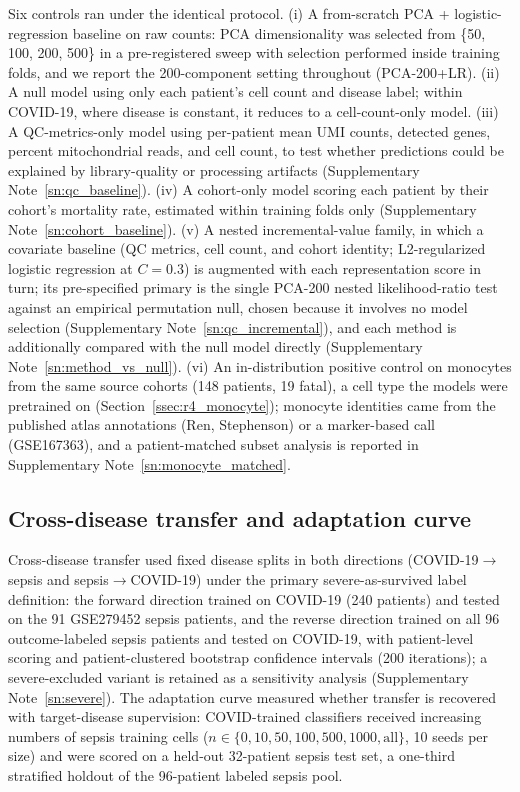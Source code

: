 \documentclass[11pt,a4paper]{article}
\begin{document}
Six controls ran under the identical protocol. (i) A from-scratch
PCA + logistic-regression baseline on raw counts: PCA dimensionality was
selected from \{50, 100, 200, 500\} in a pre-registered sweep with
selection performed inside training folds, and we report the 200-component
setting throughout (PCA-200+LR). (ii) A null model using only each patient's
cell count and disease label; within COVID-19, where disease is constant, it
reduces to a cell-count-only model. (iii) A QC-metrics-only model using
per-patient mean UMI counts, detected genes, percent mitochondrial reads, and
cell count, to test whether predictions could be explained by library-quality
or processing artifacts (Supplementary Note~\ref{sn:qc_baseline}).
(iv) A cohort-only model scoring each patient by their cohort's mortality
rate, estimated within training folds only
(Supplementary Note~\ref{sn:cohort_baseline}). (v) A nested incremental-value
family, in which a covariate baseline (QC metrics, cell count, and cohort
identity; L2-regularized logistic regression at $C = 0.3$) is augmented with
each representation score in turn; its pre-specified primary is the single
PCA-200 nested likelihood-ratio test against an empirical permutation null,
chosen because it involves no model selection
(Supplementary Note~\ref{sn:qc_incremental}), and each method is additionally
compared with the null model directly
(Supplementary Note~\ref{sn:method_vs_null}). (vi) An
in-distribution positive control on monocytes from the same source cohorts
(148 patients, 19 fatal), a cell type the models were pretrained on
(Section~\ref{ssec:r4_monocyte}); monocyte identities came from the published
atlas annotations (Ren, Stephenson) or a marker-based call (GSE167363), and a
patient-matched subset analysis is reported in
Supplementary Note~\ref{sn:monocyte_matched}.

\subsection{Cross-disease transfer and adaptation curve}
\label{ssec:methods_transfer}

Cross-disease transfer used fixed disease splits in both directions
(COVID-19$\rightarrow$sepsis and sepsis$\rightarrow$COVID-19) under the primary
severe-as-survived label definition: the forward direction trained on COVID-19
(240 patients) and tested on the 91 GSE279452 sepsis patients, and the reverse
direction trained on all 96 outcome-labeled sepsis patients and tested on
COVID-19, with patient-level scoring and patient-clustered bootstrap
confidence intervals (200 iterations); a
severe-excluded variant is retained as a sensitivity analysis
(Supplementary Note~\ref{sn:severe}). The adaptation curve measured whether
transfer is recovered with target-disease supervision: COVID-trained
classifiers received increasing numbers of sepsis training cells
($n \in \{0, 10, 50, 100, 500, 1000, \text{all}\}$, 10 seeds per size) and were
scored on a held-out 32-patient sepsis test set, a one-third stratified
holdout of the 96-patient labeled sepsis pool.
\end{document}
